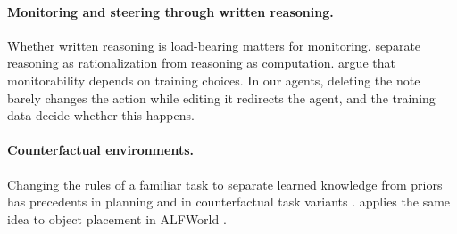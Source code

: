 \paragraph{Monitoring and steering through written reasoning.}
Whether written reasoning is load-bearing matters for monitoring. \citet{emmons2025necessary} separate reasoning as rationalization from reasoning as computation. \citet{korbak2025monitorability} argue that monitorability depends on training choices. In our  agents, deleting the note barely changes the action while editing it redirects the agent, and the training data decide whether this happens.

\paragraph{Counterfactual environments.}
Changing the rules of a familiar task to separate learned knowledge from priors has precedents in planning \citep{valmeekam2023planbench} and in counterfactual task variants \citep{wu2024reciting}. \alfcf{} applies the same idea to object placement in ALFWorld \citep{shridhar2021alfworld}.
